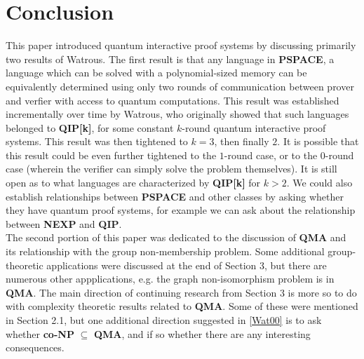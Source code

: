 \documentclass[12pt]{article}
\numberwithin{thm}{section}
\numberwithin{defn}{section}
\numberwithin{prop}{section}
\numberwithin{rmk}{section}
\begin{document}
	\section{Conclusion}
	This paper introduced quantum interactive proof systems by discussing primarily two results of Watrous. The first result is that any language in \textbf{PSPACE}, a language which can be solved with a polynomial-sized memory can be equivalently determined using only two rounds of communication between  prover and verfier with access to quantum computations. This result was established incrementally over time by Watrous, who originally showed that such languages belonged to \textbf{QIP[k]}, for some constant $k$-round quantum interactive proof systems. This result was then tightened to $k=3$, then finally $2$. It is possible that this result could be even further tightened to the $1$-round case, or to the $0$-round case (wherein the verifier can simply solve the problem themselves). It is still open as to what languages are characterized by \textbf{{QIP[k]}} for $k>2$. We could also establish relationships between \textbf{PSPACE} and other classes by asking whether they have quantum proof systems, for example we can ask about the relationship between \textbf{NEXP} and \textbf{QIP}.\\
	
	The second portion of this paper was dedicated to the discussion of \textbf{QMA} and its relationship with the group non-membership problem. Some additional group-theoretic applications were discussed at the end of Section 3,  but there are numerous other appplications, e.g. the graph non-isomorphism problem is in \textbf{QMA}. The main direction of continuing research from Section 3 is more so to do with complexity theoretic results related to \textbf{QMA}. Some of these were mentioned in Section 2.1, but one additional direction suggested in \hyperref[wat00]{[Wat00]} is to ask whether \textbf{co-NP} $\subseteq$ \textbf{QMA}, and if so whether there are any interesting consequences.
	
	
\end{document}
